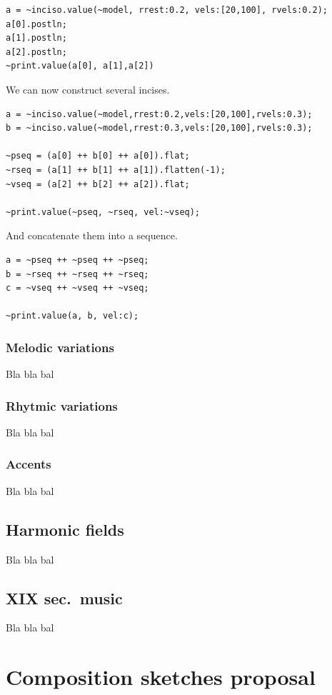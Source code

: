 \begin{enumerate}
\begin{lstlisting}[frame=single]
a = ~inciso.value(~model, rrest:0.2, vels:[20,100], rvels:0.2);
a[0].postln;
a[1].postln;
a[2].postln;
~print.value(a[0], a[1],a[2])
\end{lstlisting}

We can now construct several incises.

\begin{lstlisting}[frame=single] 
a = ~inciso.value(~model,rrest:0.2,vels:[20,100],rvels:0.3);
b = ~inciso.value(~model,rrest:0.3,vels:[20,100],rvels:0.3);

~pseq = (a[0] ++ b[0] ++ a[0]).flat;
~rseq = (a[1] ++ b[1] ++ a[1]).flatten(-1);
~vseq = (a[2] ++ b[2] ++ a[2]).flat;

~print.value(~pseq, ~rseq, vel:~vseq);
\end{lstlisting}

And concatenate them into a sequence.

\begin{lstlisting}[frame=single] 
a = ~pseq ++ ~pseq ++ ~pseq;
b = ~rseq ++ ~rseq ++ ~rseq;
c = ~vseq ++ ~vseq ++ ~vseq; 

~print.value(a, b, vel:c);
\end{lstlisting}
\end{enumerate}

\subsubsection{Melodic variations}\label{melodic-variations}

Bla bla bal

\subsubsection{Rhytmic variations}\label{rhytmic-variations}

Bla bla bal

\subsubsection{Accents}\label{accents}

Bla bla bal

\subsection{Harmonic fields}\label{harmonic-fields}

Bla bla bal

\subsection{XIX sec.~music}\label{xix-sec.-music}

Bla bla bal

\section{Composition sketches proposal}\label{composition-sketches-proposal}


